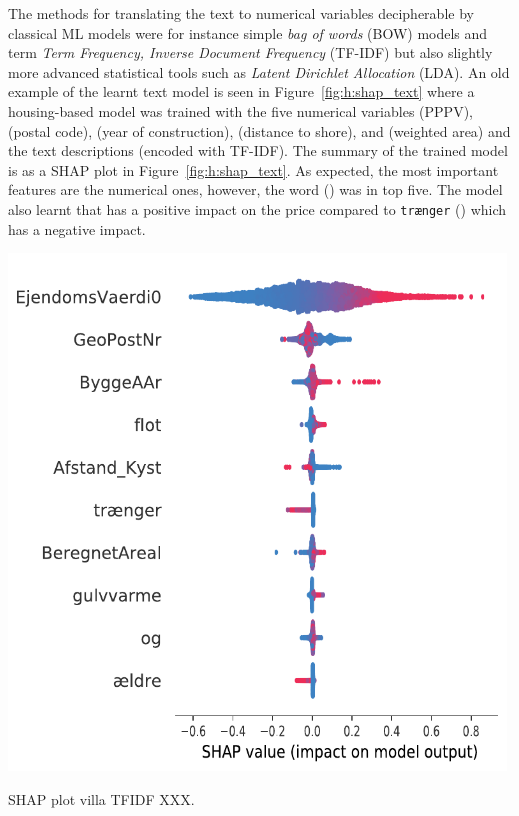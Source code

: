 The methods for translating the text to numerical variables decipherable by classical ML models were for instance simple \emph{bag of words} (BOW) models and term \emph{Term Frequency, Inverse Document Frequency} (TF-IDF) but also slightly more advanced statistical tools such as \emph{Latent Dirichlet Allocation} (LDA). An old example of the learnt text model is seen in Figure~\ref{fig:h:shap_text} where a housing-based model was trained with the five numerical variables  (PPPV),  (postal code),  (year of construction),  (distance to shore), and  (weighted area) and the text descriptions (encoded with TF-IDF). The summary of the trained model is as a SHAP plot in Figure~\ref{fig:h:shap_text}. As expected, the most important features are the numerical ones, however, the word  () was in top five. The model also learnt that  has a positive impact on the price compared to \colorbox{light-gray}{\texttt{trænger}} () which has a negative impact.

\begin{marginfigure}
  \includegraphics[width=0.99\textwidth]{figures/housing_text/villa_tfidf.pdf}
  \caption[SHAP plot villa TFIDF XXX]{SHAP plot villa TFIDF XXX.}
  \label{fig:h:shap_text}
\end{marginfigure}

